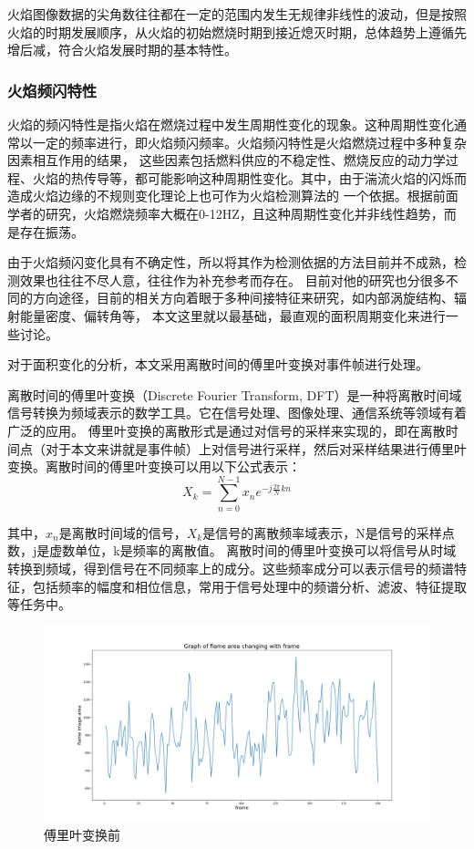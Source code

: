 火焰图像数据的尖角数往往都在一定的范围内发生无规律非线性的波动，但是按照火焰的时期发展顺序，从火焰的初始燃烧时期到接近熄灭时期，总体趋势上遵循先增后减，符合火焰发展时期的基本特性。

\subsubsection{火焰频闪特性}
火焰的频闪特性是指火焰在燃烧过程中发生周期性变化的现象。这种周期性变化通常以一定的频率进行，即火焰频闪频率。火焰频闪特性是火焰燃烧过程中多种复杂因素相互作用的结果，
这些因素包括燃料供应的不稳定性、燃烧反应的动力学过程、火焰的热传导等，都可能影响这种周期性变化。其中，由于湍流火焰的闪烁而造成火焰边缘的不规则变化理论上也可作为火焰检测算法的
一个依据。根据前面学者的研究，火焰燃烧频率大概在0-12HZ，且这种周期性变化并非线性趋势，而是存在振荡。

由于火焰频闪变化具有不确定性，所以将其作为检测依据的方法目前并不成熟，检测效果也往往不尽人意，往往作为补充参考而存在。
目前对他的研究也分很多不同的方向途径，目前的相关方向着眼于多种间接特征来研究，如内部涡旋结构、辐射能量密度、偏转角等，
本文这里就以最基础，最直观的面积周期变化来进行一些讨论。

对于面积变化的分析，本文采用离散时间的傅里叶变换对事件帧进行处理。

离散时间的傅里叶变换（Discrete Fourier Transform, DFT）\cite{fly}是一种将离散时间域信号转换为频域表示的数学工具。它在信号处理、图像处理、通信系统等领域有着广泛的应用。
傅里叶变换的离散形式是通过对信号的采样来实现的，即在离散时间点（对于本文来讲就是事件帧）上对信号进行采样，然后对采样结果进行傅里叶变换。离散时间的傅里叶变换可以用以下公式表示：
\begin{equation} 
    X_k=\sum_{n=0}^{N-1}x_n e^{-j\frac{2\pi}{N}kn}
\end{equation}

其中，$x_n$是离散时间域的信号，$X_k$是信号的离散频率域表示，N是信号的采样点数，j是虚数单位，k是频率的离散值。
离散时间的傅里叶变换可以将信号从时域转换到频域，得到信号在不同频率上的成分。这些频率成分可以表示信号的频谱特征，包括频率的幅度和相位信息，常用于信号处理中的频谱分析、滤波、特征提取等任务中。

\begin{figure}[ht]
  \centering
  \includegraphics[width=\textwidth]{figures/extract_flicker_01.png}
  \caption{傅里叶变换前}
  \label{8}
\end{figure}

